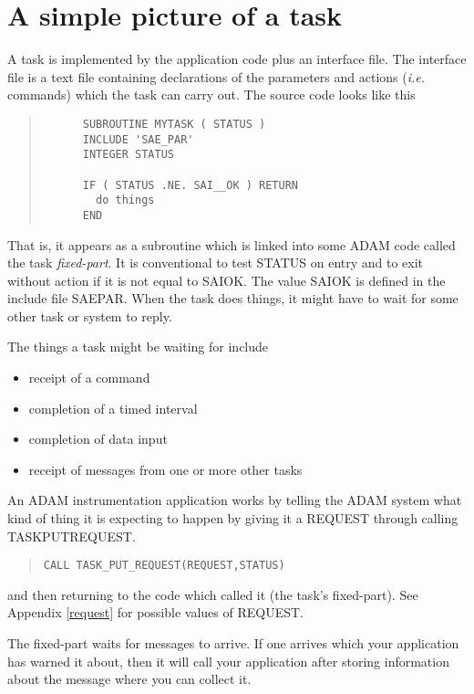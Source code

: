 \documentclass[twoside,11pt]{article}
\newcommand{\xlabel}[1]{}
\renewcommand{\_}{\texttt{\symbol{95}}}
\begin{document}
\section{A simple picture of a task\xlabel{a_simple_picture_of_a_task}}

A task is implemented by the application code plus an interface file. 
The interface file is a text file containing declarations of the 
parameters and actions ({\em i.e.} commands) which the task can carry out. The 
source code looks like this
\small \begin{quote} \begin{verbatim}
      SUBROUTINE MYTASK ( STATUS )
      INCLUDE 'SAE_PAR'
      INTEGER STATUS

      IF ( STATUS .NE. SAI__OK ) RETURN
        do things
      END
\end{verbatim} \end{quote} \normalsize

That is, it appears as a subroutine which is linked into some ADAM code 
called the task {\em fixed-part}.
It is conventional to test STATUS on entry and to exit without action if it
is not equal to SAI\_\_OK. The value SAI\_\_OK is defined in the include file
SAE\_PAR.
When the task does things, it might have to wait for some other task or 
system to reply.

The things a task might be waiting for include
\begin{itemize}
\item receipt of a command
\item completion of a timed interval
\item completion of data input
\item receipt of messages from one or more other tasks
\end{itemize}
An ADAM instrumentation application works by telling the ADAM system
what kind of thing it is expecting to happen by giving it a REQUEST
through calling TASK\_PUT\_REQUEST.

\small \begin{quote} \begin{verbatim}
CALL TASK_PUT_REQUEST(REQUEST,STATUS)
\end{verbatim} \end{quote} \normalsize

and then returning to the code which called it (the task's fixed-part).
See Appendix \ref{request} for possible values of REQUEST. 

The fixed-part waits for messages to arrive. If one arrives which your 
application has warned it about, then it will call your application 
after storing information about the message where you can collect it.
\end{document}
